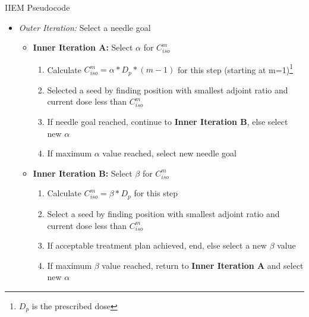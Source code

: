 \documentclass{beamer}
\begin{document}
\begin{frame}{IIEM Pseudocode}
  
  \begin{itemize}
    \item \textit{Outer Iteration:} Select a needle goal
      \begin{itemize}
        \item \textbf{Inner Iteration A:} Select $\alpha$ for $C_{iso}^m$
          \begin{enumerate}
            \item Calculate $C_{iso}^m = \alpha *D_p*(m-1)$ for this step 
              (starting at m=1)\footnote{$D_p$ is the prescribed dose}
            \item Selected a seed by finding position with smallest 
              adjoint ratio and current dose less than $C_{iso}^m$
            \item If needle goal reached, continue to 
              \textbf{Inner Iteration B}, else select new $\alpha$
            \item If maximum $\alpha$ value reached, select new needle 
                  goal
          \end{enumerate}
          \medskip
        \item \textbf{Inner Iteration B:} Select $\beta$ for $C_{iso}^m$
          \begin{enumerate}
            \item Calculate $C_{iso}^m = \beta*D_p$ for this step
            \item Select a seed by finding position with smallest adjoint
              ratio and current dose less than $C_{iso}^m$
            \item If acceptable treatment plan achieved, end, else select a
              new $\beta$ value
            \item If maximum $\beta$ value reached, return to 
              \textbf{Inner Iteration A} and select new $\alpha$
          \end{enumerate}
      \end{itemize}
  \end{itemize}

\end{frame}

\end{document}
